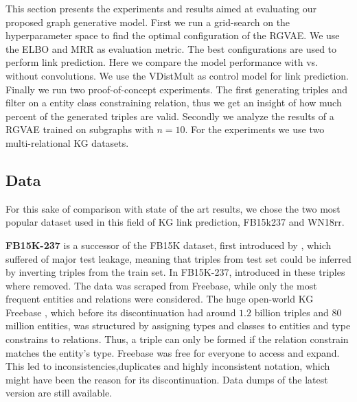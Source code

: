 
This section presents the experiments and results aimed at evaluating our proposed graph generative model. First we run a grid-search on the hyperparameter space to find the optimal configuration of the RGVAE. We use the ELBO and MRR as evaluation metric. The best configurations are used to perform link prediction. Here we compare the model performance with vs. without convolutions. We use the VDistMult as control model for link prediction. Finally we run two proof-of-concept experiments. The first generating triples and filter on a entity class constraining relation, thus we get an insight of how much percent of the generated triples are valid. Secondly we analyze the results of a RGVAE trained on subgraphs with $n=10$. For the experiments we use two multi-relational KG datasets.



\subsection{Data}
\label{ssec5:data}
For this sake of comparison with state of the art results, we chose the two most popular dataset used in this field of KG link prediction, FB15k237 and WN18rr.


\textbf{FB15K-237} is a successor of the FB15K dataset, first introduced by \cite{bordes_translating_2013}, which suffered of major test leakage, meaning that triples from test set could be inferred by inverting triples from the train set. In FB15K-237, introduced in \cite{toutanova_representing_2015} these triples where removed.
The data was scraped from Freebase, while only the most frequent entities and relations were considered. The huge open-world KG Freebase \cite{bollacker_freebase_2008}, which before its discontinuation had around $1.2$ billion triples and $80$ million entities, was structured by assigning types and classes to entities and type constrains to relations. Thus, a triple can only be formed if the relation constrain matches the entity's type. Freebase was free for everyone to access and expand. This led to inconsistencies,duplicates and highly inconsistent notation, which might have been the reason for its discontinuation. Data dumps of the latest version are still available.




